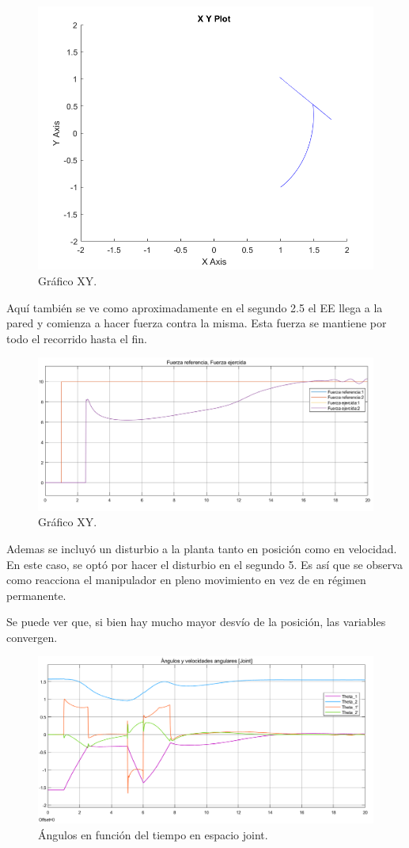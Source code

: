 \begin{figure}[H]
	\centering
	\includegraphics[width=0.5\linewidth]{ImagenesControl híbrido no lineal/3_3_c}
	\caption{Gráfico XY.}	
	\label{fig:cxy}
\end{figure}

Aquí también se ve como aproximadamente en el segundo 2.5 el EE llega a la pared y comienza a hacer fuerza contra la misma. Esta fuerza se mantiene por todo el recorrido hasta el fin.

\begin{figure}[H]
	\centering
	\includegraphics[width=0.8\linewidth]{ImagenesControl híbrido no lineal/3_3_e}
	\caption{Gráfico XY.}	
	\label{fig:cf}
\end{figure}

Ademas se incluyó un disturbio a la planta tanto en posición como en velocidad. En este caso, se optó por hacer el disturbio en el segundo 5. Es así que se observa como reacciona el manipulador en pleno movimiento en vez de en régimen permanente.

Se puede ver que, si bien hay mucho mayor desvío de la posición, las variables convergen. 

\begin{figure}[H]
	\centering
	\includegraphics[width=0.8\linewidth]{ImagenesControl híbrido no lineal/3_3_f_a}
	\caption{Ángulos en función del tiempo en espacio joint.}	
	\label{fig:cthetasd}
\end{figure}

